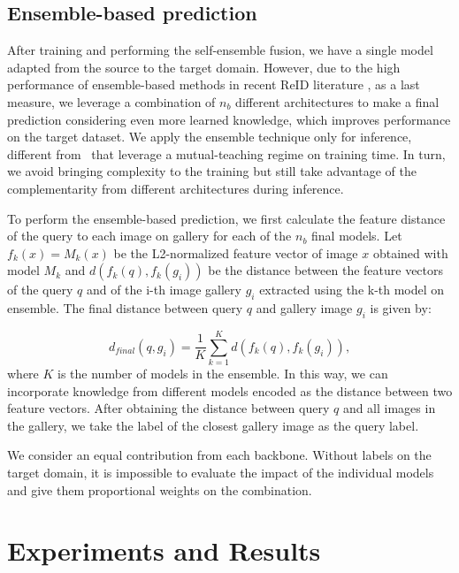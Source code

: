 \documentclass[journal]{IEEEtran}
\begin{document}
\subsection{Ensemble-based prediction}
After training and performing the self-ensemble fusion, we have a single model adapted from the source to the target domain. However, due to the high performance of ensemble-based methods in recent ReID literature \cite{ge2020mutual, zhai2020multiple}, as a last measure, we leverage a combination of $n_{b}$ different architectures to make a final prediction considering even more learned knowledge, which improves performance on the target dataset. We apply the ensemble technique only for inference, different from~\cite{ge2020mutual, zhai2020multiple} that leverage a mutual-teaching regime on training time. In turn, we avoid bringing complexity to the training but still take advantage of the complementarity from different architectures during inference. 

To perform the ensemble-based prediction, we first calculate the feature distance of the query to each image on gallery for each of the $n_{b}$ final models. Let $ f_{k}(x) = M_{k}(x)$ be the L2-normalized feature vector of image $ x $ obtained with model $ M_{k}$ and $d(f_{k}(q), f_{k}(g_{i}))$ be the distance between the feature vectors of the query $ q $ and of the i-th image gallery $ g_{i} $ extracted using the k-th model on ensemble. The final distance between query $ q $ and gallery image $ g_{i} $ is given by:

\begin{equation}
\label{eq:ensemble_backbones}
    d_{final}(q, g_{i}) = \frac{1}{K} \sum_{k = 1}^{K} d(f_{k}(q), f_{k}(g_{i})),
\end{equation}
\noindent where $ K $ is the number of models in the ensemble. In this way, we can incorporate knowledge from different models encoded as the distance between two feature vectors. After obtaining the distance between query $ q $ and all images in the gallery, we take the label of the closest gallery image as the query label. 

We consider an equal contribution from each backbone. Without labels on the target domain, it is impossible to evaluate the impact of the individual models and give them proportional weights on the combination. 



\section{Experiments and Results}
\label{sec:experiments}
\end{document}
